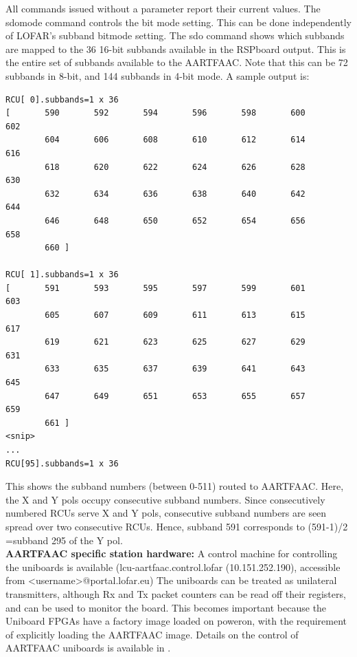 \documentclass {article}
\begin{document}
All  commands issued  without a  parameter report  their current  values.  The
sdomode command controls the bit mode  setting. This can be done independently
of LOFAR's  subband bitmode  setting. The  sdo command  shows which
subbands  are mapped  to  the 36  16-bit subbands  available  in the  RSPboard
output. This  is the entire  set of subbands  available to the  AARTFAAC. Note
that this  can be 72  subbands in  8-bit, and 144  subbands in 4-bit  mode.  A
sample output is:
\begin{verbatim}
RCU[ 0].subbands=1 x 36
[       590       592       594       596       598       600       602 
        604       606       608       610       612       614       616 
        618       620       622       624       626       628       630 
        632       634       636       638       640       642       644 
        646       648       650       652       654       656       658 
        660 ]

RCU[ 1].subbands=1 x 36
[       591       593       595       597       599       601       603 
        605       607       609       611       613       615       617 
        619       621       623       625       627       629       631 
        633       635       637       639       641       643       645 
        647       649       651       653       655       657       659 
        661 ]
<snip>
...
RCU[95].subbands=1 x 36
\end{verbatim}
This shows the subband numbers (between 0-511) routed to AARTFAAC. Here, the X and Y
pols  occupy consecutive  subband numbers.  Since consecutively  numbered RCUs
serve  X and  Y pols,  consecutive subband  numbers are  seen spread  over two
consecutive RCUs. Hence, subband 591 corresponds to (591-1)/2 =subband 295 of
the Y pol.\\

\textbf {AARTFAAC specific station hardware:}  A control machine for controlling  the uniboards is
available   (lcu-aartfaac.control.lofar   (10.151.252.190),  accessible   from
<username>@portal.lofar.eu)  The  uniboards  can   be  treated  as  unilateral
transmitters,  although Rx  and  Tx  packet counters  can  be  read off  their
registers,  and can  be used  to monitor  the board.   This becomes  important
because the  Uniboard FPGAs have a  factory image loaded on  poweron, with the
requirement of explicitly  loading the AARTFAAC image. Details  on the control
of AARTFAAC uniboards is available in \cite{RP-1463}.
\end{document}
